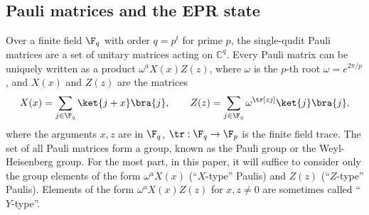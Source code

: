 \subsection{Pauli matrices and the EPR state}
\label{sec:paulis}
Over a finite field $\F_q$ with order $q = p^t$ for prime $p$, the single-qudit Pauli matrices are a set
of unitary matrices acting on $\mathbb{C}^q$. Every Pauli matrix can
be uniquely written as a product $\omega^{a} X(x) Z(z)$, where $\omega$ is the $p$-th root
$\omega = e^{2\pi/p}$, and $X(x)$ and $Z(z)$ are the matrices
\begin{equation}
  X(x) = \sum_{j \in \F_q} \ket{j+x}\bra{j}, \qquad Z(z) =
  \sum_{j \in \F_q} \omega^{\tr[z j]}\ket{j}
  \bra{j}, \label{eq:pauli-definition} \end{equation}
where the arguments $x, z$ are in $\F_q$, $\tr: \F_q \to \F_p$ is the finite field
trace. The set of all Pauli matrices form a group, known as the Pauli
group or the Weyl-Heisenberg group. For the most part,
in this paper, it will suffice to consider only the group elements of
the form
$\omega^a X(x)$ (``$X$-type'' Paulis) and $Z(z)$ (``$Z$-type''
Paulis). Elements of the form $\omega^a X(x)Z(z)$ for $x, z \neq 0$
are sometimes called ``$Y$-type''.

